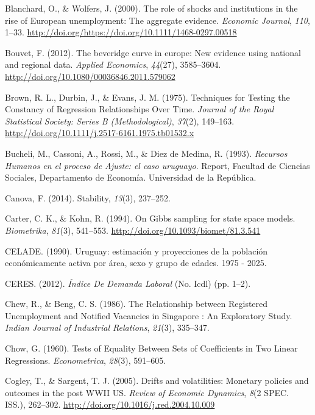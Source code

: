 \documentclass[12pt,oneside]{reedthesis}
\begin{document}
\leavevmode\hypertarget{ref-Blanchard2000}{}%
Blanchard, O., \& Wolfers, J. (2000). The role of shocks and institutions in the rise of European unemployment: The aggregate evidence. \emph{Economic Journal}, \emph{110}, 1--33. \url{http://doi.org/https://doi.org/10.1111/1468-0297.00518}

\leavevmode\hypertarget{ref-Bouvet2012}{}%
Bouvet, F. (2012). The beveridge curve in europe: New evidence using national and regional data. \emph{Applied Economics}, \emph{44}(27), 3585--3604. \url{http://doi.org/10.1080/00036846.2011.579062}

\leavevmode\hypertarget{ref-Brown1975}{}%
Brown, R. L., Durbin, J., \& Evans, J. M. (1975). Techniques for Testing the Constancy of Regression Relationships Over Time. \emph{Journal of the Royal Statistical Society: Series B (Methodological)}, \emph{37}(2), 149--163. \url{http://doi.org/10.1111/j.2517-6161.1975.tb01532.x}

\leavevmode\hypertarget{ref-DECON1993}{}%
Bucheli, M., Cassoni, A., Rossi, M., \& Diez de Medina, R. (1993). \emph{Recursos Humanos en el proceso de Ajuste: el caso uruguayo}. Report, Facultad de Ciencias Sociales, Departamento de Economía. Universidad de la República.

\leavevmode\hypertarget{ref-Canova1995}{}%
Canova, F. (2014). Stability, \emph{13}(3), 237--252.

\leavevmode\hypertarget{ref-KarterKohn1994}{}%
Carter, C. K., \& Kohn, R. (1994). On Gibbs sampling for state space models. \emph{Biometrika}, \emph{81}(3), 541--553. \url{http://doi.org/10.1093/biomet/81.3.541}

\leavevmode\hypertarget{ref-Celade1990}{}%
CELADE. (1990). Uruguay: estimación y proyecciones de la población económicamente activa por área, sexo y grupo de edades. 1975 - 2025.

\leavevmode\hypertarget{ref-Ceres2012}{}%
CERES. (2012). \emph{Índice De Demanda Laboral} (No. Icdl) (pp. 1--2).

\leavevmode\hypertarget{ref-Chew1986}{}%
Chew, R., \& Beng, C. S. (1986). The Relationship between Registered Unemployment and Notified Vacancies in Singapore : An Exploratory Study. \emph{Indian Journal of Industrial Relations}, \emph{21}(3), 335--347.

\leavevmode\hypertarget{ref-Chow1960}{}%
Chow, G. (1960). Tests of Equality Between Sets of Coefficients in Two Linear Regressions. \emph{Econometrica}, \emph{28}(3), 591--605.

\leavevmode\hypertarget{ref-Cogley2005}{}%
Cogley, T., \& Sargent, T. J. (2005). Drifts and volatilities: Monetary policies and outcomes in the post WWII US. \emph{Review of Economic Dynamics}, \emph{8}(2 SPEC. ISS.), 262--302. \url{http://doi.org/10.1016/j.red.2004.10.009}
\end{document}
